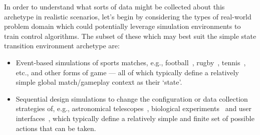 In order to understand what sorts of data might be collected about this archetype in realistic scenarios, let's begin by considering the types of real-world problem domain which could potentially leverage simulation environments to train control algorithms. The subset of these which may best suit the simple state transition environment archetype are:
\begin{itemize}
\item{Event-based simulations of sports matches, e.g., football~\cite{pulis2022reinforcement}, rugby~\cite{sawczuk2022markov}, tennis~\cite{ding2022deep}, etc., and other forms of game --- all of which typically define a relatively simple global match/gameplay context as their `state'.}
\item{Sequential design simulations to change the configuration or data collection strategies of, e.g., astronomical telescopes~\cite{jia2023observation,yatawatta2021deep}, biological experiments~\cite{treloar2022deep} and user interfaces~\cite{lomas2016interface}, which typically define a relatively simple and finite set of possible actions that can be taken.}
\end{itemize}
